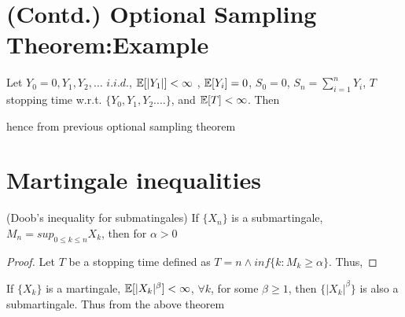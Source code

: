 \documentclass[all-lectures.tex]{subfiles}
\begin{document}

\setcounter{section}{1}
\setcounter{subsection}{1}

\section*{}

\section{(Contd.) Optional Sampling Theorem:Example}
\begin{exmp}
Let $Y_0 = 0, Y_1, Y_2, \dots$ $i.i.d.$, $\mathbb{E}[|Y_1|] < \infty$ , $\mathbb{E}[Y_i]= 0$,
$S_0 = 0$, $S_n = \sum_{i=1}^{n} Y_i$, $T$ stopping time w.r.t. $\{Y_0, Y_1, Y_2. \dots\}$, and  $\mathbb{E}[T]< \infty$. Then

hence from previous optional sampling theorem
\end{exmp}

\section{Martingale inequalities}
\begin{thm}(Doob's inequality for submatingales)
If $\{X_n\}$ is a submartingale, $M_n = sup_{0 \le k \le n} X_k$, then for $\alpha>0$
\end{thm}
\begin{proof}
Let $T$ be a stopping time defined as $T= n \wedge inf\{k:M_k \ge \alpha\}$.
Thus,
\end{proof}
If  $\{X_k\}$ is a martingale, $\mathbb{E}[|X_k|^\beta] < \infty$, $\forall k$, for some $\beta \ge 1$, then $\{|X_k|^\beta\}$ is also a submartingale. Thus from the above theorem
\end{document}

